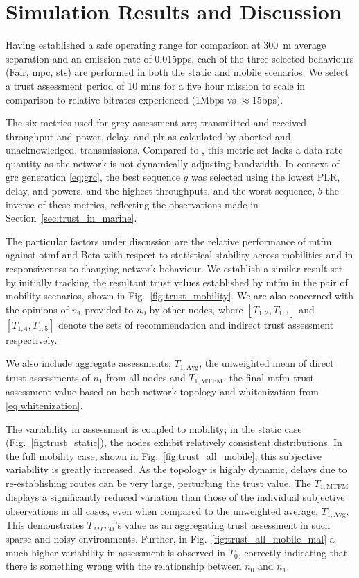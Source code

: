 \section{Simulation Results and Discussion}\label{sec:trustresultsanddiscussion}

Having established a safe operating range for comparison at \SI{300}{\meter} average separation and an emission rate of 0.015pps, each of the three selected behaviours (Fair, \gls{mpc}, \gls{sts}) are performed in both the static and mobile scenarios. 
We select a trust assessment period of 10 mins for a five hour mission to scale in comparison to relative bitrates experienced (1Mbps vs $\approx15$bps).

The six metrics used for grey assessment are; transmitted and received throughput and power, delay, and \gls{plr} as calculated by aborted and unacknowledged, transmissions.
Compared to \cite{Guo11}, this metric set lacks a data rate quantity as the network is not dynamically adjusting bandwidth.
In context of \gls{grc} generation \eqref{eq:grc}, the best sequence $g$ was selected using the lowest PLR, delay, and powers, and the highest throughputs, and the worst sequence, $b$ the inverse of these metrics, reflecting the observations made in Section~\ref{sec:trust_in_marine}.

The particular factors under discussion are the relative performance of \gls{mtfm} against \gls{otmf} and Beta with respect to statistical stability across mobilities and in responsiveness to changing network behaviour. 
We establish a similar result set by initially tracking the resultant trust values established by \gls{mtfm} in the pair of mobility scenarios, shown in Fig.~\ref{fig:trust_mobility}.
We are also concerned with the opinions of $n_1$ provided to $n_0$ by other nodes, where $[T_{1,2},T_{1,3}]$ and $[T_{1,4},T_{1,5}]$ denote the sets of recommendation and indirect trust assessment respectively.

We also include aggregate assessments; $T_{1,\text{Avg}}$, the unweighted mean of direct trust assessments of $n_1$ from all nodes and $T_{1,\text{MTFM}}$, the final \gls{mtfm} trust assessment value based on both network topology and whitenization from \eqref{eq:whitenization}.

The variability in assessment is coupled to mobility; in the static case (Fig.~\ref{fig:trust_static}), the nodes exhibit relatively consistent distributions.
In the full mobility case, shown in Fig.~\ref{fig:trust_all_mobile}, this subjective variability is greatly increased. 
As the topology is highly dynamic, delays due to re-establishing routes can be very large, perturbing the trust value.
The $T_{1,\text{MTFM}}$ displays a significantly reduced variation than those of the individual subjective observations in all cases, even when compared to the unweighted average, $T_{1,\text{Avg}}$.
This demonstrates $T_{MTFM}$'s value as an aggregating trust assessment in such sparse and noisy environments.
Further, in Fig.~\ref{fig:trust_all_mobile_mal} a much higher variability in assessment is observed in $T_0$, correctly indicating that there is something wrong with the relationship between $n_0$ and $n_1$.

